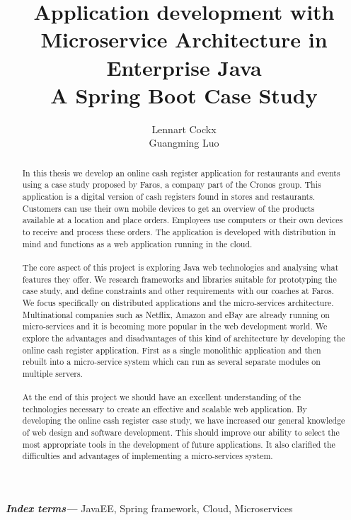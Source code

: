 \documentclass[12pt]{article}
\title{Application development with\\ Microservice Architecture in Enterprise Java\\ A Spring Boot Case Study}
\author{Lennart Cockx\\Guangming Luo}
\providecommand{\keywords}[1]{\textbf{\textit{Index terms---}} #1}
\begin{document}
\maketitle
\newpage
\tableofcontents
\newpage

\begin{abstract}
\noindent In this thesis we develop an online cash register application for restaurants and events using a case study proposed by Faros, a company part of the Cronos group. This application is a digital version of cash registers found in stores and restaurants. Customers can use their own mobile devices to get an overview of the products available at a location and place orders. Employees  use computers or their own devices to receive and process these orders. The application is developed with distribution in mind and functions as a web application running in the cloud. 
\\\\
The core aspect of this project is exploring Java web technologies and analysing what features they offer. We research frameworks and libraries suitable for prototyping the case study, and define constraints and other requirements with our coaches at Faros. We focus specifically on distributed applications and the micro-services architecture. Multinational companies such as Netflix, Amazon and eBay are already running on micro-services and it is becoming more popular in the web development world. We explore the advantages and disadvantages of this kind of architecture by developing the online cash register application. First as a single monolithic application and then rebuilt into a micro-service system which can run as several separate modules on multiple servers.
\\\\
At the end of this project we should have an excellent understanding of the technologies necessary to create an effective and scalable web application. By developing the online cash register case study, we have increased our general knowledge of web design and software development. This should improve our ability to select the most appropriate tools in the development of future applications. It also clarified the difficulties and advantages of implementing a micro-services system. 
\end{abstract}
\keywords{JavaEE, Spring framework, Cloud, Microservices}
\end{document}
